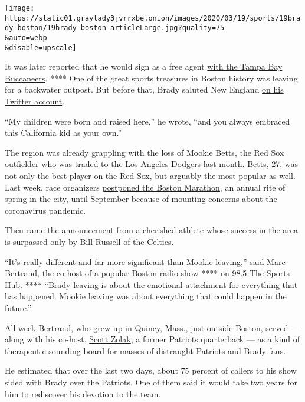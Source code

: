 \texttt{[image: https://static01.graylady3jvrrxbe.onion/images/2020/03/19/sports/19brady-boston/19brady-boston-articleLarge.jpg?quality=75\\\&auto=webp\\\&disable=upscale]}

It was later reported that he would sign as a free agent
\href{https://www.nytimes3xbfgragh.onion/2020/03/18/sports/football/tom-brady-tampa-bay-buccaneers.html}{with
the Tampa Bay Buccaneers}. **** One of the great sports treasures in
Boston history was leaving for a backwater outpost. But before that,
Brady saluted New England
\href{https://twitter.com/TomBrady/status/1239895697207549952}{on his
Twitter account}.

``My children were born and raised here,'' he wrote, ``and you always
embraced this California kid as your own.''

The region was already grappling with the loss of Mookie Betts, the Red
Sox outfielder who was
\href{https://www.nytimes3xbfgragh.onion/2020/02/05/sports/baseball/mookie-betts-trade-red-sox.html}{traded
to the Los Angeles Dodgers} last month. Betts, 27, was not only the best
player on the Red Sox, but arguably the most popular as well. Last week,
race organizers
\href{https://www.nytimes3xbfgragh.onion/2020/03/13/sports/boston-marathon-london-marathon-postponed-coronavirus.html}{postponed
the Boston Marathon}, an annual rite of spring in the city, until
September because of mounting concerns about the coronavirus pandemic.

Then came the announcement from a cherished athlete whose success in the
area is surpassed only by Bill Russell of the Celtics.

``It's really different and far more significant than Mookie leaving,''
said Marc Bertrand, the co-host of a popular Boston radio show **** on
\href{https://985thesportshub.com/}{98.5 The Sports Hub}. **** ``Brady
leaving is about the emotional attachment for everything that has
happened. Mookie leaving was about everything that could happen in the
future.''

All week Bertrand, who grew up in Quincy, Mass., just outside Boston,
served --- along with his co-host,
\href{https://www.pro-football-reference.com/players/Z/ZolaSc00.htm}{Scott
Zolak}, a former Patriots quarterback --- as a kind of therapeutic
sounding board for masses of distraught Patriots and Brady fans.

He estimated that over the last two days, about 75 percent of callers to
his show sided with Brady over the Patriots. One of them said it would
take two years for him to rediscover his devotion to the team.

